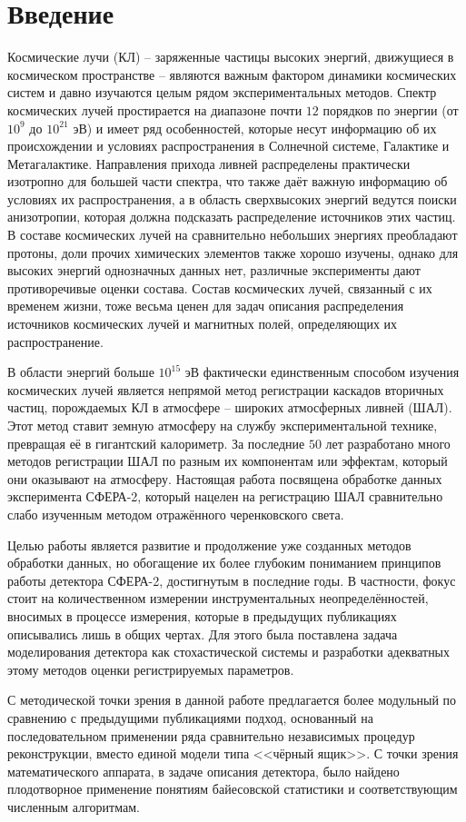 \chapter*{Введение}

Космические лучи (КЛ) -- заряженные частицы высоких энергий, движущиеся в космическом пространстве -- являются важным фактором динамики космических систем и давно изучаются целым рядом экспериментальных методов. Спектр космических лучей простирается на диапазоне почти $12$ порядков по энергии (от $10^{9}$ до $10^{21}$ эВ) и имеет ряд особенностей, которые несут информацию об их происхождении и условиях распространения в Солнечной системе, Галактике и Метагалактике. Направления прихода ливней распределены практически изотропно для большей части спектра, что также даёт важную информацию об условиях их распространения, а в область сверхвысоких энергий ведутся поиски анизотропии, которая должна подсказать распределение источников этих частиц. В составе космических лучей на сравнительно небольших энергиях преобладают протоны, доли прочих химических элементов также хорошо изучены, однако для высоких энергий однозначных данных нет, различные эксперименты дают противоречивые оценки состава. Состав космических лучей, связанный с их временем жизни, тоже весьма ценен для задач описания распределения источников космических лучей и магнитных полей, определяющих их распространение.

В области энергий больше $10^{15}$ эВ фактически единственным способом изучения космических лучей является непрямой метод регистрации каскадов вторичных частиц, порождаемых КЛ в атмосфере -- широких атмосферных ливней (ШАЛ). Этот метод ставит земную атмосферу на службу экспериментальной технике, превращая её в гигантский калориметр. За последние $50$ лет разработано много методов регистрации ШАЛ по разным их компонентам или эффектам, который они оказывают на атмосферу. Настоящая работа посвящена обработке данных эксперимента СФЕРА-2, который нацелен на регистрацию ШАЛ сравнительно слабо изученным методом отражённого черенковского света.

Целью работы является развитие и продолжение уже созданных методов обработки данных, но обогащение их более глубоким пониманием принципов работы детектора СФЕРА-2, достигнутым в последние годы. В частности, фокус стоит на количественном измерении инструментальных неопределённостей, вносимых в процессе измерения, которые в предыдущих публикациях описывались лишь в общих чертах. Для этого была поставлена задача моделирования детектора как стохастической системы и разработки адекватных этому методов оценки регистрируемых параметров.

С методической точки зрения в данной работе предлагается более модульный по сравнению с предыдущими публикациями подход, основанный на последовательном применении ряда сравнительно независимых процедур реконструкции, вместо единой модели типа <<чёрный ящик>>. С точки зрения математического аппарата, в задаче описания детектора, было найдено плодотворное применение понятиям байесовской статистики и соответствующим численным алгоритмам.
